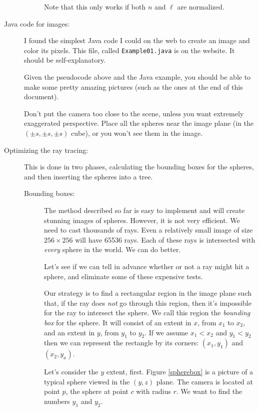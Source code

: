 \documentclass{article}
\begin{document}
\begin{description}
\begin{description}
Note that this only works if both $n$ and $\ell$ are normalized.

  \end{description}
  

\item[Java code for images:]
  I found the simplest Java code I could on the web to create an image
  and color its pixels.  This file, called {\tt Example01.java} is on
  the website.  It should be self-explanatory.

  Given the pseudocode above and the Java example, you should be able
  to make some pretty amazing pictures (such as the ones at the end of
  this document).

  Don't put the camera too close to the scene, unless you want
  extremely exaggerated perspective.  Place all the spheres near the
  image plane (in the $(\pm s, \pm s, \pm s)$ cube), or you won't see
  them in the image.

\item[Optimizing the ray tracing:]  This is done in two phases,
  calculating the bounding boxes for the spheres, and then inserting
  the spheres into a tree.

  \begin{description}
    \item[Bounding boxes:]
  The method described so far is easy to implement and will create
  stunning images of spheres.  However, it is not very efficient.  We
  need to cast thousands of rays.  Even a relatively small image of
  size $256\times256$ will have 65536 rays.  Each of these rays is
  intersected with {\em every} sphere in the world.  We can do better.

  Let's see if we can tell in advance whether or not a ray might hit a
  sphere, and eliminate some of these expensive tests.

Our strategy is to find a rectangular region in the image plane such
that, if the ray does {\em not} go through this region, then it's
impossible for the ray to intersect the sphere.  We call this region
the {\em bounding box} for the sphere.  It will consist of an extent
in $x$, from $x_1$ to $x_2$, and an extent in $y$, from $y_1$ to
$y_2$.  If we assume   $x_1 < x_2$ and $y_1 < y_2$ then we can
represent the rectangle by its corners: $(x_1,y_1)$ and $(x_2, y_x)$.  

Let's consider the $y$ extent, first.  Figure \ref{spherebox} is a
picture of a typical sphere viewed in the $(y,z)$ plane.  The camera is
located at point $p$, the sphere at point $c$ with radius $r$.  We
want to find the numbers $y_1$ and $y_2$.




\end{description}
\end{description}
\end{document}
